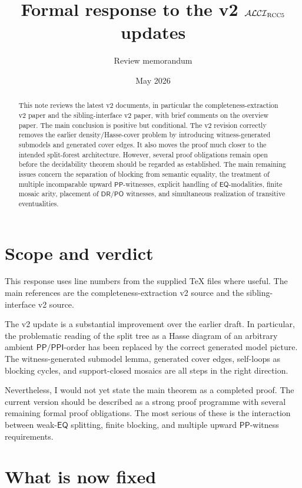 \documentclass[11pt]{article}
\title{Formal response to the v2 \texorpdfstring{$\mathcal{ALCI}_{\mathrm{RCC5}}$}{ALCI-RCC5} updates}
\author{Review memorandum}
\date{May 2026}
\newcommand{\PP}{\mathsf{PP}}
\newcommand{\PPI}{\mathsf{PPI}}
\newcommand{\PO}{\mathsf{PO}}
\newcommand{\DR}{\mathsf{DR}}
\newcommand{\EQ}{\mathsf{EQ}}
\begin{document}
\maketitle

\begin{abstract}
This note reviews the latest v2 documents, in particular
the completeness-extraction v2 paper and the sibling-interface v2 paper, with brief comments on the overview paper.  The main conclusion is positive but conditional.
The v2 revision correctly removes the earlier density/Hasse-cover problem by
introducing witness-generated submodels and generated cover edges.  It also
moves the proof much closer to the intended split-forest architecture.  However,
several proof obligations remain open before the decidability theorem should be
regarded as established.  The main remaining issues concern the separation of
blocking from semantic equality, the treatment of multiple incomparable upward
\(\PP\)-witnesses, explicit handling of \(\EQ\)-modalities, finite mosaic arity,
placement of \(\DR/\PO\) witnesses, and simultaneous realization of transitive
eventualities.
\end{abstract}

\section{Scope and verdict}

This response uses line numbers from the supplied TeX files where useful.  The main references are the completeness-extraction v2 source and the sibling-interface v2 source.

The v2 update is a substantial improvement over the earlier draft.  In
particular, the problematic reading of the split tree as a Hasse diagram of an
arbitrary ambient \(\PP/\PPI\)-order has been replaced by the correct generated
model picture.  The witness-generated submodel lemma, generated cover edges,
self-loops as blocking cycles, and support-closed mosaics are all steps in the
right direction.

Nevertheless, I would not yet state the main theorem as a completed proof.
The current version should be described as a strong proof programme with several
remaining formal proof obligations.  The most serious of these is the interaction
between weak-\(\EQ\) splitting, finite blocking, and multiple upward
\(\PP\)-witness requirements.

\section{What is now fixed}
\end{document}
